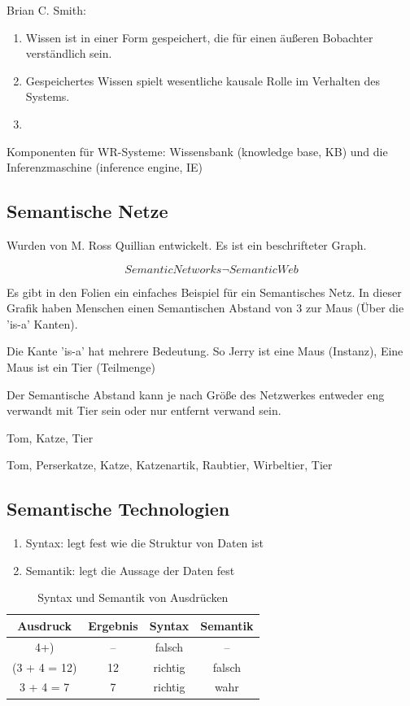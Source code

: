 \documentclass[a4paper]{article}
\begin{document}
Brian C. Smith: 

\begin{enumerate}
    \item Wissen ist in einer Form gespeichert, die für einen äußeren Bobachter verständlich sein.
    \item Gespeichertes Wissen spielt wesentliche kausale Rolle im Verhalten des Systems.
    \item 
\end{enumerate}

Komponenten für WR-Systeme: Wissensbank (knowledge base, KB) und die Inferenzmaschine (inference engine, IE)

\subsection{Semantische Netze}

Wurden von M. Ross Quillian entwickelt. Es ist ein beschrifteter Graph.

\[
Semantic Networks \neg Semantic Web
\]

Es gibt in den Folien ein einfaches Beispiel für ein Semantisches Netz. In dieser Grafik haben Menschen einen Semantischen Abstand von 3 zur Maus (Über die 'is-a' Kanten).

Die Kante 'is-a' hat mehrere Bedeutung. So Jerry ist eine Maus (Instanz), Eine Maus ist ein Tier (Teilmenge)

Der Semantische Abstand kann je nach Größe des Netzwerkes entweder eng verwandt mit Tier sein oder nur entfernt verwand sein.

Tom, Katze, Tier

Tom, Perserkatze, Katze, Katzenartik, Raubtier, Wirbeltier, Tier

\subsection{Semantische Technologien}

\begin{enumerate}
    \item Syntax: legt fest wie die Struktur von Daten ist
    \item Semantik: legt die Aussage der Daten fest
\end{enumerate}

\begin{table}[h]
    \centering
    \begin{tabular}{c|c|c|c}
        Ausdruck & Ergebnis & Syntax & Semantik \\
        \hline
        4+) & -- & falsch & -- \\
        (3 + 4 = 12) & 12 & richtig & falsch \\
        3 + 4 = 7 & 7 & richtig & wahr \\
    \end{tabular}
    \caption{Syntax und Semantik von Ausdrücken}
\end{table}
\end{document}
